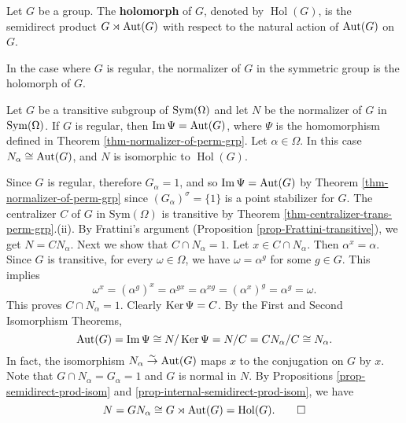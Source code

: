 \begin{definition}
	Let $G$ be a group. The \textbf{holomorph} of $G$, denoted by $\operatorname{Hol} (G)$, is the semidirect product $G \rtimes \operatorname{Aut} (G)$ with respect to the natural action of $\operatorname{Aut} (G)$ on $G$.
\end{definition}
In the case where $G$ is regular,  the normalizer of $G$ in the symmetric group is the holomorph of $G$.
\begin{corollary}
	Let $G$ be a transitive subgroup of $\operatorname{Sym} (\Omega)$ and let $N$ be the normalizer of $G$ in $\operatorname{Sym} (\Omega)$. If $G$ is regular, then $\operatorname{Im}  \Psi = \operatorname{Aut} (G)$, where $\Psi$ is the homomorphism defined in Theorem \ref{thm-normalizer-of-perm-grp}. Let $\alpha\in \Omega$. In this case $N_\alpha \cong \operatorname{Aut} (G)$, and $N$ is isomorphic to $\operatorname{Hol}(G)$.
\end{corollary}
\begin{sketch}
	Since $G$ is regular, therefore $G_\alpha = 1$, and so $\operatorname{Im}  \Psi = \operatorname{Aut} (G)$ by Theorem \ref{thm-normalizer-of-perm-grp} since $(G_\alpha)^{\sigma} = \{1\}$ is a point stabilizer for $G$. The centralizer $C$ of $G$ in $\text{Sym}(\Omega)$ is transitive by Theorem \ref{thm-centralizer-trans-perm-grp}.(ii). By Frattini's argument (Proposition \ref{prop-Frattini-transitive}), we get $N = CN_\alpha$. Next we show that $C \cap N_\alpha = 1$. Let $x\in C \cap N_\alpha$. Then $\alpha^x = \alpha$. Since $G$ is transitive, for every $\omega\in\Omega$, we have $\omega = \alpha^g$ for some $g\in G$. This implies 
	\begin{equation*}
		\omega^x = (\alpha^g)^x =\alpha^{gx} = \alpha^{xg} = (\alpha^x)^g = \alpha^g = \omega. 
	\end{equation*}
	This proves $C \cap N_\alpha = 1$. Clearly $\operatorname{Ker}\Psi = C$. By the First and Second Isomorphism Theorems, 
\begin{equation*}
	\operatorname{Aut} (G) =\operatorname{Im}  \Psi \cong N/\operatorname{Ker} \Psi = N/C = CN_\alpha/C \cong N_\alpha.
\end{equation*} In fact, the isomorphism $N_\alpha\stackrel{\sim}{\rightarrow}\operatorname{Aut} (G)$ maps $x$ to the conjugation on $G$ by $x$. Note that $G \cap N_\alpha = G_\alpha = 1$ and $G$ is normal in $N$. By Propositions \ref{prop-semidirect-prod-isom} and \ref{prop-internal-semidirect-prod-isom}, we have 
\begin{equation*}
	N = GN_\alpha \cong G \rtimes \operatorname{Aut} (G) = \operatorname{Hol}(G). \qedhere
\end{equation*}
\end{sketch} 

